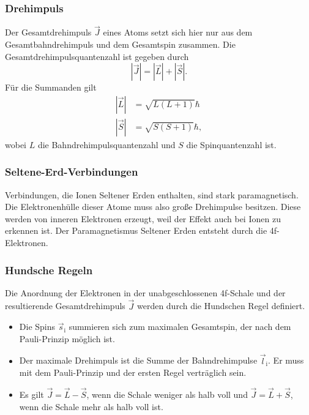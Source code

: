 \subsubsection{Drehimpuls}
Der Gesamtdrehimpuls $\vec{J}$ eines Atoms setzt sich hier nur aus dem Gesamtbahndrehimpuls und dem Gesamtspin 
zusammen. Die Gesamtdrehimpulsquantenzahl ist gegeben durch
\begin{equation*}
    |\vec{J}| = |\vec{L}| + |\vec{S}|.
\end{equation*}
Für die Summanden gilt
\begin{align*}
   |\vec{L}| &= \sqrt{L(L+1)} \hbar \\
   |\vec{S}| &= \sqrt{S(S+1)} \hbar,
\end{align*}
wobei $L$ die Bahndrehimpulsquantenzahl und $S$ die Spinquantenzahl ist.

\subsubsection{Seltene-Erd-Verbindungen}
Verbindungen, die Ionen Seltener Erden enthalten, sind stark paramagnetisch. 
Die Elektronenhülle dieser Atome muss also große Drehimpulse besitzen. 
Diese werden von inneren Elektronen erzeugt, weil der Effekt auch bei Ionen zu erkennen ist. 
Der Paramagnetismus Seltener Erden entsteht durch die 4f-Elektronen. %


\subsubsection{Hundsche Regeln}
Die Anordnung der Elektronen in der unabgeschlossenen 
4f-Schale und der resultierende Gesamtdrehimpuls $\vec{J}$ werden durch die Hundschen 
Regel definiert. 
\begin{itemize}
\item Die Spins $\vec{s}_\text{i}$ summieren sich zum maximalen Gesamtspin, der nach dem 
Pauli-Prinzip möglich ist.
\item Der maximale Drehimpuls ist die Summe der Bahndrehimpulse $\vec{l}_\text{i}$. Er 
muss mit dem Pauli-Prinzip und der ersten Regel verträglich sein. 
\item Es gilt $\vec{J}= \vec{L} - \vec{S}$, wenn die Schale weniger als halb voll und 
$\vec{J}= \vec{L} + \vec{S}$, wenn die Schale mehr als halb voll ist.
\end{itemize}


